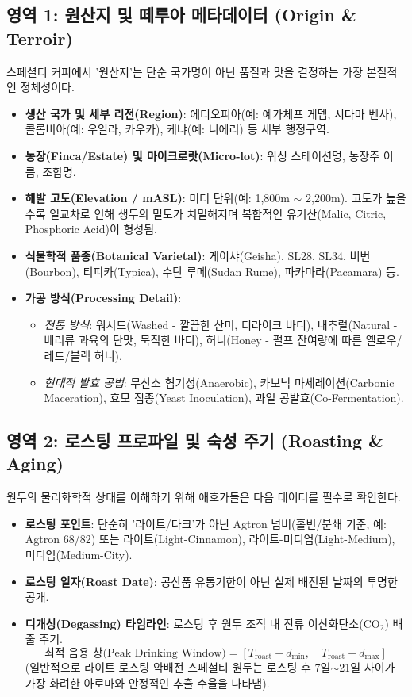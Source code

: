 \documentclass[10pt,a4paper]{article}
\begin{document}
\subsection{영역 1: 원산지 및 떼루아 메타데이터 (Origin \& Terroir)}
스페셜티 커피에서 '원산지'는 단순 국가명이 아닌 품질과 맛을 결정하는 가장 본질적인 정체성이다.
\begin{itemize}[itemsep=2pt]
    \item \textbf{생산 국가 및 세부 리전(Region)}: 에티오피아(예: 예가체프 게뎁, 시다마 벤사), 콜롬비아(예: 우일라, 카우카), 케냐(예: 니에리) 등 세부 행정구역.
    \item \textbf{농장(Finca/Estate) 및 마이크로랏(Micro-lot)}: 워싱 스테이션명, 농장주 이름, 조합명.
    \item \textbf{해발 고도(Elevation / mASL)}: 미터 단위(예: 1,800m $\sim$ 2,200m). 고도가 높을수록 일교차로 인해 생두의 밀도가 치밀해지며 복합적인 유기산(Malic, Citric, Phosphoric Acid)이 형성됨.
    \item \textbf{식물학적 품종(Botanical Varietal)}: 게이샤(Geisha), SL28, SL34, 버번(Bourbon), 티피카(Typica), 수단 루메(Sudan Rume), 파카마라(Pacamara) 등.
    \item \textbf{가공 방식(Processing Detail)}:
    \begin{itemize}
        \item \textit{전통 방식}: 워시드(Washed - 깔끔한 산미, 티라이크 바디), 내추럴(Natural - 베리류 과육의 단맛, 묵직한 바디), 허니(Honey - 펄프 잔여량에 따른 옐로우/레드/블랙 허니).
        \item \textit{현대적 발효 공법}: 무산소 혐기성(Anaerobic), 카보닉 마세레이션(Carbonic Maceration), 효모 접종(Yeast Inoculation), 과일 공발효(Co-Fermentation).
    \end{itemize}
\end{itemize}

\subsection{영역 2: 로스팅 프로파일 및 숙성 주기 (Roasting \& Aging)}
원두의 물리화학적 상태를 이해하기 위해 애호가들은 다음 데이터를 필수로 확인한다.
\begin{itemize}[itemsep=2pt]
    \item \textbf{로스팅 포인트}: 단순히 '라이트/다크'가 아닌 Agtron 넘버(홀빈/분쇄 기준, 예: Agtron 68/82) 또는 라이트(Light-Cinnamon), 라이트-미디엄(Light-Medium), 미디엄(Medium-City).
    \item \textbf{로스팅 일자(Roast Date)}: 공산품 유통기한이 아닌 실제 배전된 날짜의 투명한 공개.
    \item \textbf{디개싱(Degassing) 타임라인}: 로스팅 후 원두 조직 내 잔류 이산화탄소($\text{CO}_2$) 배출 주기.
    \begin{equation}
        \text{최적 음용 창(Peak Drinking Window)} = [T_{\text{roast}} + d_{\text{min}}, \quad T_{\text{roast}} + d_{\text{max}}]
    \end{equation}
    (일반적으로 라이트 로스팅 약배전 스페셜티 원두는 로스팅 후 7일$\sim$21일 사이가 가장 화려한 아로마와 안정적인 추출 수율을 나타냄).
\end{itemize}
\end{document}

